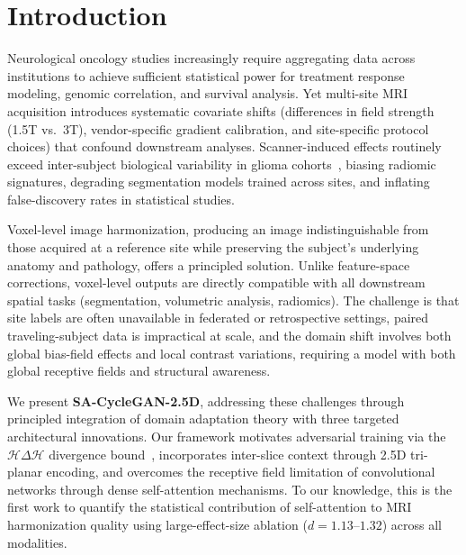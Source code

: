 \documentclass{article}
\begin{document}
\section{Introduction}
\label{sec:intro}

Neurological oncology studies increasingly require aggregating data across institutions
to achieve sufficient statistical power for treatment response modeling, genomic
correlation, and survival analysis. Yet multi-site MRI acquisition introduces systematic
covariate shifts (differences in field strength (1.5T vs.\ 3T), vendor-specific
gradient calibration, and site-specific protocol choices) that confound downstream
analyses. Scanner-induced effects routinely exceed inter-subject biological variability in
glioma cohorts~\cite{fortin2018harmonization}, biasing radiomic signatures, degrading
segmentation models trained across sites, and inflating false-discovery rates in
statistical studies.

Voxel-level image harmonization, producing an image indistinguishable from those
acquired at a reference site while preserving the subject's underlying anatomy and
pathology, offers a principled solution. Unlike feature-space corrections, voxel-level
outputs are directly compatible with all downstream spatial tasks (segmentation,
volumetric analysis, radiomics). The challenge is that site labels are often unavailable
in federated or retrospective settings, paired traveling-subject data is impractical at
scale, and the domain shift involves both global bias-field effects and local contrast
variations, requiring a model with both global receptive fields and structural awareness.

We present \textbf{SA-CycleGAN-2.5D}, addressing these challenges through principled
integration of domain adaptation theory with three targeted architectural innovations.
Our framework motivates adversarial training via the $\mathcal{H}\Delta\mathcal{H}$
divergence bound~\cite{ben2010theory}, incorporates inter-slice context through 2.5D
tri-planar encoding, and overcomes the receptive field limitation of convolutional networks
through dense self-attention mechanisms. To our knowledge, this is the first work to
quantify the statistical contribution of self-attention to MRI harmonization quality using
large-effect-size ablation ($d{=}1.13\text{--}1.32$) across all modalities.
\end{document}
